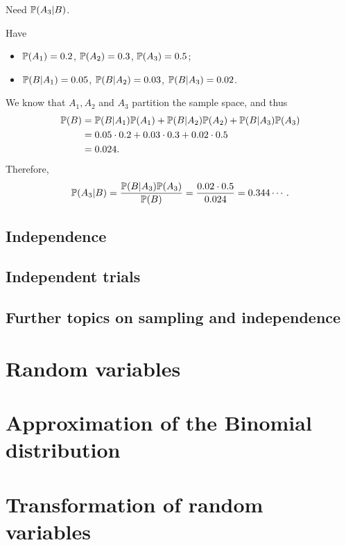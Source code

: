 Need $\mathbb{P}(A_3|B)$.

Have
\begin{itemize}
\item $\mathbb{P}(A_1) = 0.2$, $\mathbb{P}(A_2) = 0.3$, $\mathbb{P}(A_3) = 0.5$;
\item $\mathbb{P}(B|A_1) = 0.05$, $\mathbb{P}(B|A_2) = 0.03$, $\mathbb{P}(B|A_3) = 0.02$.
\end{itemize}
We know that $A_1,A_2$ and $A_3$ partition the sample space, and thus
\begin{align*}
  \mathbb{P}(B) & = \mathbb{P}(B|A_1)\mathbb{P}(A_1)+\mathbb{P}(B|A_2)\mathbb{P}(A_2) + \mathbb{P}(B|A_3)\mathbb{P}(A_3)\\
         & = 0.05\cdot 0.2 + 0.03\cdot 0.3 + 0.02 \cdot 0.5\\
  & = 0.024.
\end{align*}
Therefore,
\[
  \mathbb{P}(A_3|B) = \frac{\mathbb{P}(B|A_3)\mathbb{P}(A_3)}{\mathbb{P}(B)} = \frac{0.02\cdot 0.5}{0.024} = 0.344\cdots.
\]
\subsection{Independence}
\label{subsec:indep}

\subsection{Independent trials}
\label{subsec:indep-trials}

\subsection{Further topics on sampling and independence}
\label{subsec:sampling-indep}




\section{Random variables}
\label{sec:random-variables}


\section{Approximation of the Binomial distribution}
\label{sec:appr-binom-distr}


\section{Transformation of random variables}
\label{sec:transf-rand-vari}

